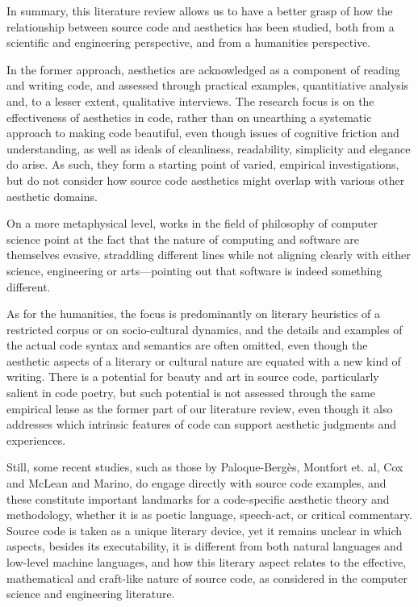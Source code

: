 In summary, this literature review allows us to have a better grasp of how the relationship between source code and aesthetics has been studied, both from a scientific and engineering perspective, and from a humanities perspective.

In the former approach, aesthetics are acknowledged as a component of reading and writing code, and assessed through practical examples, quantitiative analysis and, to a lesser extent, qualitative interviews. The research focus is on the effectiveness of aesthetics in code, rather than on unearthing a systematic approach to making code beautiful, even though issues of cognitive friction and understanding, as well as ideals of cleanliness, readability, simplicity and elegance do arise. As such, they form a starting point of varied, empirical investigations, but do not consider how source code aesthetics might overlap with various other aesthetic domains.

On a more metaphysical level, works in the field of philosophy of computer science point at the fact that the nature of computing and software are themselves evasive, straddling different lines while not aligning clearly with either science, engineering or arts—pointing out that software is indeed something different.

As for the humanities, the focus is predominantly on literary heuristics of a restricted corpus or on socio-cultural dynamics, and the details and examples of the actual code syntax and semantics are often omitted, even though the aesthetic aspects of a literary or cultural nature are equated with a new kind of writing. There is a potential for beauty and art in source code, particularly salient in code poetry, but such potential is not assessed through the same empirical lense as the former part of our literature review, even though it also addresses which intrinsic features of code can support aesthetic judgments and experiences.

Still, some recent studies, such as those by Paloque-Bergès, Montfort et. al, Cox and McLean and Marino, do engage directly with source code examples, and these constitute important landmarks for a code-specific aesthetic theory and methodology, whether it is as poetic language, speech-act, or critical commentary. Source code is taken as a unique literary device, yet it remains unclear in which aspects, besides its executability, it is different from both natural languages and low-level machine languages, and how this literary aspect relates to the effective, mathematical and craft-like nature of source code, as considered in the computer science and engineering literature.

